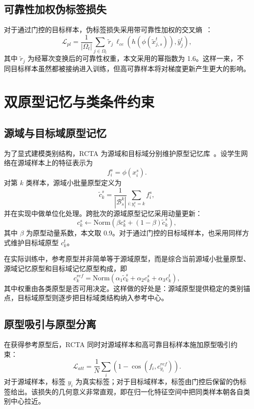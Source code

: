 \subsection{可靠性加权伪标签损失}
对于通过门控的目标样本，伪标签损失采用带可靠性加权的交叉熵~\cite{lee2013pseudolabel}：
\begin{equation}
\mathcal{L}_{pl}=
\frac{1}{|\Omega_t|}
\sum_{j\in\Omega_t}
\tilde{r}_j\,
\ell_{ce}\!\left(h(\phi(\tilde{x}_{j,s}^t)),\hat{y}_j^t\right),
\end{equation}
其中 $\tilde{r}_j$ 为经幂次变换后的可靠性权重，本文采用的幂指数为 1.6。这样一来，不同目标样本虽然都被接纳进入训练，但高可靠样本将对梯度更新产生更大的影响。

\section{双原型记忆与类条件约束}
\subsection{源域与目标域原型记忆}
为了显式建模类别结构，RCTA 为源域和目标域分别维护原型记忆库~\cite{tanwisuth2021prototype}。设学生网络在源域样本上的特征表示为
\begin{equation}
f_i^s=\phi(x_i^s).
\end{equation}
对第 $k$ 类样本，源域小批量原型定义为
\begin{equation}
\tilde{c}_{k}^{s}=
\frac{1}{|\mathcal{B}_{s}^{k}|}
\sum_{i:y_i^s=k} f_i^s,
\end{equation}
并在实现中做单位化处理。跨批次的源域原型记忆采用动量更新：
\begin{equation}
c_{k}^{s}\leftarrow
\mathrm{Norm}\!\left(
\beta c_k^s+(1-\beta)\tilde{c}_k^s
\right),
\end{equation}
其中 $\beta$ 为原型动量系数，本文取 0.9。对于通过门控的目标域样本，也采用同样方式维护目标域原型 $c_k^t$。

在实际训练中，参考原型并非简单等于源域原型，而是综合当前源域小批量原型、源域记忆原型和目标域记忆原型构成，即
\begin{equation}
c_k^{ref}=
\mathrm{Norm}\!\left(
\alpha_1 \tilde{c}_k^s+\alpha_2 c_k^s+\alpha_3 c_k^t
\right),
\end{equation}
其中权重由各类原型是否可用决定。这样做的好处是：源域原型提供稳定的类别锚点，目标域原型则逐步把目标域类结构纳入参考中心。

\subsection{原型吸引与原型分离}
在获得参考原型后，RCTA 同时对源域样本和高可靠目标样本施加原型吸引约束：
\begin{equation}
\mathcal{L}_{att}=
\frac{1}{N}\sum_{i}
\left(1-\cos(f_i,c_{y_i}^{ref})\right).
\end{equation}
对于源域样本，标签 $y_i$ 为真实标签；对于目标域样本，标签由门控后保留的伪标签给出。该损失的几何意义非常直观，即在归一化特征空间中把同类样本朝各自类别中心拉近。


